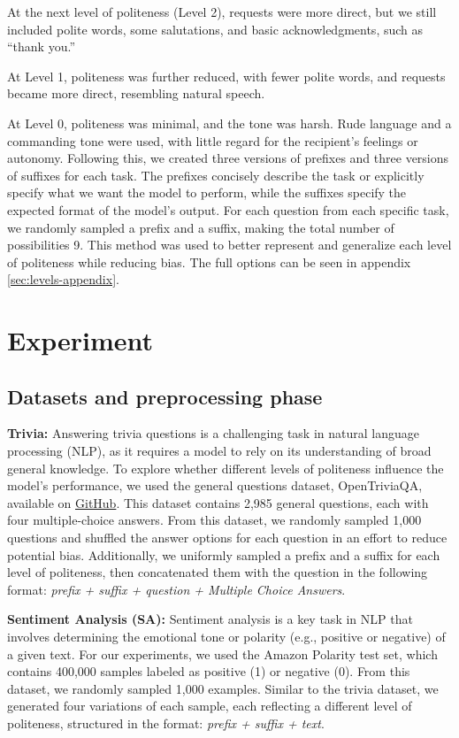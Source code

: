 \documentclass[11pt]{article}
\begin{document}
At the next level of politeness (Level 2), requests were more direct, but we still included polite words, some salutations, and basic acknowledgments, such as “thank you.”  

At Level 1, politeness was further reduced, with fewer polite words, and requests became more direct, resembling natural speech. 

At Level 0, politeness was minimal, and the tone was harsh. Rude language and a commanding tone were used, with little regard for the recipient's feelings or autonomy. Following this, we created three versions of prefixes and three versions of suffixes for each task. The prefixes concisely describe the task or explicitly specify what we want the model to perform, while the suffixes specify the expected format of the model's output. For each question from each specific task, we randomly sampled a prefix and a suffix, making the total number of possibilities 9. This method was used to better represent and generalize each level of politeness while reducing bias. The full options can be seen in appendix \ref{sec:levels-appendix}.

\section{Experiment}

\subsection{Datasets and preprocessing phase}

\textbf{Trivia:} Answering trivia questions is a challenging task in natural language processing (NLP), as it requires a model to rely on its understanding of broad general knowledge. To explore whether different levels of politeness influence the model's performance, we used the general questions dataset, OpenTriviaQA, available on \href{https://github.com/uberspot/OpenTriviaQA/blob/master/categories/general}{GitHub}. This dataset contains 2,985 general questions, each with four multiple-choice answers. From this dataset, we randomly sampled 1,000 questions and shuffled the answer options for each question in an effort to reduce potential bias. Additionally, we uniformly sampled a prefix and a suffix for each level of politeness, then concatenated them with the question in the following format: \textit{prefix + suffix + question +  Multiple Choice Answers}.


\textbf{Sentiment Analysis (SA):} Sentiment analysis is a key task in NLP that involves determining the emotional tone or polarity (e.g., positive or negative) of a given text. For our experiments, we used the Amazon Polarity test set, which contains 400,000 samples labeled as positive (1) or negative (0). From this dataset, we randomly sampled 1,000 examples. Similar to the trivia dataset, we generated four variations of each sample, each reflecting a different level of politeness, structured in the format: \textit{prefix + suffix + text}.
\end{document}
